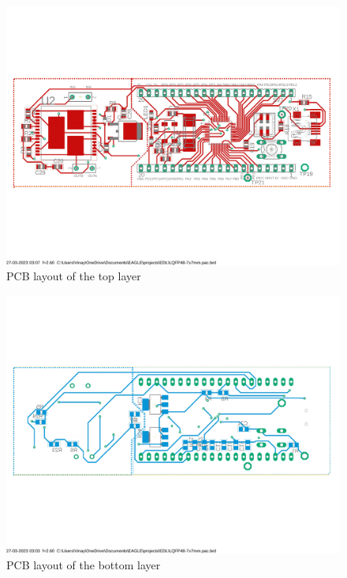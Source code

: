 \documentclass[12pt]{article}
\begin{document}
\begin{figure}[htp]
    \centering
    \includegraphics[width=\textwidth]{Images/ourpcbtop.pdf}
    \caption{PCB layout of the top layer}
    \label{fig:galaxy}
\end{figure}

\begin{figure}[htp]
    \centering
    \includegraphics[width=\textwidth]{Images/ourpcbbottom.pdf}
    \caption{PCB layout of the bottom layer}
    \label{fig:galaxy}
\end{figure}
\end{document}
